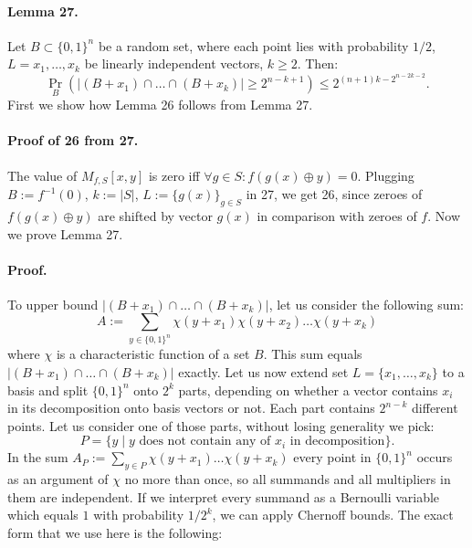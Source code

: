 \documentclass[10pt,a4paper]{article}
\begin{document}
\paragraph{Lemma 27.} Let $B\subset\{0,1\}^n$ be a random set, where each point lies with probability $1/2$, $L=x_1,\ldots,x_k$ be linearly independent vectors, $k\geq2$. Then:
\[\Pr_B(|(B+x_1)\cap\ldots\cap(B+x_k)|\geq2^{n-k+1})\leq2^{(n+1)k-2^{n-2k-2}}.\]
First we show how Lemma 26 follows from Lemma 27.
\paragraph{Proof of 26 from 27.} The value of $M_{f,S}[x,y]$ is zero iff $\forall g\in S:f(g(x)\oplus y)=0$. Plugging $B:=f^{-1}(0)$, $k:=|S|$, $L:=\{g(x)\}_{g\in S}$ in 27, we get 26, since zeroes of $f(g(x)\oplus y)$ are shifted by vector $g(x)$ in comparison with zeroes of $f$.
Now we prove Lemma 27.
\paragraph{Proof.} To upper bound $|(B+x_1)\cap\ldots\cap(B+x_k)|$, let us consider the following sum:
\[A:=\sum_{y\in\{0,1\}^n}\chi(y+x_1)\chi(y+x_2)\ldots\chi(y+x_k)\]
where $\chi$ is a characteristic function of a set $B$. This sum equals $|(B+x_1)\cap\ldots\cap(B+x_k)|$ exactly.
Let us now extend set $L=\{x_1,\ldots,x_k\}$ to a basis and split $\{0,1\}^n$ onto $2^k$ parts, depending on whether a vector contains $x_i$ in its decomposition onto basis vectors or not. Each part contains $2^{n-k}$ different points. Let us consider one of those parts, without losing generality we pick:
\[P=\{y\mid y\text{ does not contain any of }x_i\text{ in decomposition}\}.\]
In the sum $A_P:=\sum_{y\in P}\chi(y+x_1)\ldots\chi(y+x_k)$ every point in $\{0,1\}^n$ occurs as an argument of $\chi$ no more than once, so all summands and all multipliers in them are independent.
If we interpret every summand as a Bernoulli variable which equals $1$ with probability $1/2^k$, we can apply Chernoff bounds.
The exact form that we use here is the following:
\end{document}
